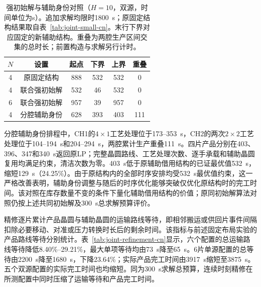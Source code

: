 \documentclass[final,5p,times,twocolumn]{elsarticle}
\begin{document}
\begin{table}[!t]
\centering\scriptsize\setlength{\tabcolsep}{2.5pt}
\caption{强初始解与辅助身份对照（$H=10$，双源，时间单位为s）。追加求解均限时1800~s；原固定结构结果取自表~\ref{tab:joint-small-cn}。末行下界对应固定的新辅助结构。重叠为两腔生产区间交集的总时长；前置构造与求解另行计时。}
\label{tab:joint-auxiliary-cn}
\begin{tabular}{cccccc}\toprule
$N$ & 设置 & 起点 & 下界 & 上界 & 重叠\\\midrule
4 & 原固定结构 & 888 & 532 & 532 & 0\\
4 & 联合强初始解 & 532 & 46 & 532 & 0\\
6 & 联合强初始解 & 957 & 39 & 957 & 0\\
4 & 分腔辅助身份 & 628 & 393 & 403 & 111\\
\bottomrule\end{tabular}\end{table}

分腔辅助身份排程中，CH1的$4\times1$工艺处理位于173--353~s，CH2的两次$2\times2$工艺处理位于104--194~s和204--294~s，两腔累计生产重叠111~s。四片产品分别在403、396、347和340~s返回原LP；完整晶圆路线、工艺处理次数、逐手承载和辅助晶圆复用均满足约束，清洁次数为零。403~s低于原辅助借用结构的已证最优值532~s，缩短129~s（24.25\%）。由于原结构内的全部时序安排均受532~s最优值约束，这一严格改善表明，辅助身份调整与随后的时序优化能够突破仅优化原结构时的完工时间。该对照在库存数量不变的条件下量化辅助借用结构的价值；原同初始解算法对照仍按上述共同初始解及300~s总求解预算评价。

精修逐片累计产品晶圆与辅助晶圆的运输路线等待，即相邻搬运或供回片事件间隔扣除必要移动、对准或压力转换时长后的剩余时间。该指标与前述固定布局实验的产品路线等待分别统计。表~\ref{tab:joint-refinement-cn}显示，六个配置的总运输路线等待降低8.40\%--29.21\%，最大单项等待均由73~s降至65~s。6片单源配置的总等待由2200~s降至1680~s，下降23.64\%；实际产品完工时间由3917~s缩短至3875~s。五个双源配置的实际完工时间也均缩短。同为300~s求解总预算，连续时刻精修在所测配置中同时压缩了运输等待和产品完工时间。
\end{document}
